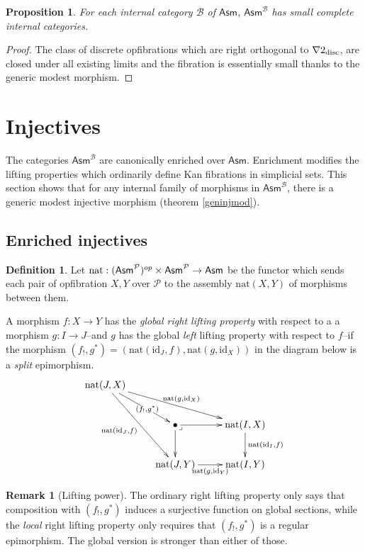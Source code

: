 \documentclass{amsart}
\theoremstyle{plain}
\newtheorem{prop}[theorem]{Proposition}
\theoremstyle{definition}
\newtheorem{defin}[theorem]{Definition}
\newtheorem{remark}[theorem]{Remark}
\newcommand\cat\mathcal
\newcommand\id{\mathrm{id}}
\newcommand\ri{^*}
\newcommand\Asm{\mathsf{Asm}}
\begin{document}
\begin{prop} For each internal category $\cat B$ of $\Asm$, $\Asm^{\cat B}$ has small complete internal categories.\end{prop}

\begin{proof} The class of discrete opfibrations which are right orthogonal to $\nabla 2_{\rm disc}$, are closed under all existing limits and the fibration is essentially small thanks to the generic modest morphism. \end{proof}

\newcommand\sAsm{\mathsf{sAsm}}

\section{Injectives}
The categories $\Asm^{\cat B}$ are canonically enriched over $\Asm$. Enrichment modifies the lifting properties which ordinarily define Kan fibrations in simplicial sets. This section shows that for any internal family of morphisms in $\Asm^{\cat B}$, there is a generic modest injective morphism (theorem \ref{geninjmod}).

\subsection{Enriched injectives}

\newcommand\pb{\ar@{}[dr]|<\lrcorner}
\newcommand\po{\ar@{}[dr]|>\ulcorner}
\newcommand\nat{\mathrm{nat}}
\begin{defin} Let $\nat:(\Asm^{\cat P})\dual\times \Asm^{\cat P} \to \Asm$ be the functor which sends each pair of opfibration $X,Y$ over $\cat P$ to the assembly $\nat(X,Y)$ of morphisms between them.

A morphism $f:X\to Y$ has the \emph{global right lifting property} with respect to a a morphism $g:I\to J$--and $g$ has the global \emph{left} lifting property with respect to $f$--if the morphism $(f_!,g\ri) = (\nat(\id_J,f),\nat(g,\id_X))$ in the diagram below is a \emph{split} epimorphism.
\[\xymatrix{ 
\nat(J,X) \ar[drr]^{\nat(g,\id_X)} \ar[ddr]_{\nat(\id_J,f)} \ar[dr]|(.6){(f_!,g\ri)}\\
& \bullet \ar[d]\ar[r]\pb & \nat(I,X) \ar[d]^{\nat(\id_I,f)}\\
& \nat(J,Y) \ar[r]_{\nat(g,\id_Y)} & \nat(I,Y)
}\]
\end{defin} 

\begin{remark}[Lifting power] The ordinary right lifting property only says that composition with $(f_!,g\ri)$ induces a surjective function on global sections, while the \emph{local} right lifting property only requires that $(f_!,g\ri)$ is a regular epimorphism. The global version is stronger than either of those. \label{liftingpower} \end{remark}
\end{document}
